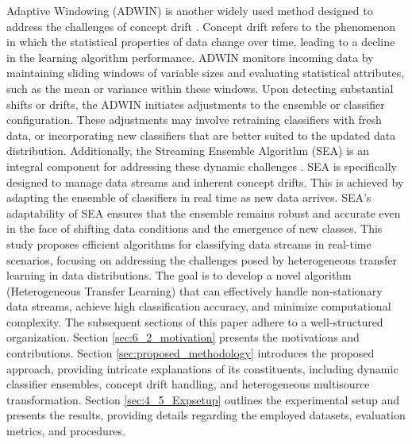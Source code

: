 Adaptive Windowing (ADWIN) is another widely used method designed to address the challenges of concept drift \cite{madkour2023historical}. Concept drift refers to the phenomenon in which the statistical properties of data change over time, leading to a decline in the learning algorithm performance. ADWIN monitors incoming data by maintaining sliding windows of variable sizes and evaluating statistical attributes, such as the mean or variance within these windows. Upon detecting substantial shifts or drifts, the ADWIN initiates adjustments to the ensemble or classifier configuration. These adjustments may involve retraining classifiers with fresh data, or incorporating new classifiers that are better suited to the updated data distribution. Additionally, the Streaming Ensemble Algorithm (SEA) is an integral component for addressing these dynamic challenges \cite{gama2004learning, adams2023explainable, madkour2023historical}. SEA is specifically designed to manage data streams and inherent concept drifts. This is achieved by adapting the ensemble of classifiers in real time as new data arrives. SEA's adaptability of SEA ensures that the ensemble remains robust and accurate even in the face of shifting data conditions and the emergence of new classes.
This study proposes efficient algorithms for classifying data streams in real-time scenarios, focusing on addressing the challenges posed by heterogeneous transfer learning in data distributions. The goal is to develop a novel algorithm (Heterogeneous Transfer Learning) that can effectively handle non-stationary data streams, achieve high classification accuracy, and minimize computational complexity. 
The subsequent sections of this paper adhere to a well-structured organization. Section \ref{sec:6_2_motivation} presents the motivations and contributions. Section \ref{sec:proposed_methodology} introduces the proposed approach, providing intricate explanations of its constituents, including dynamic classifier ensembles, concept drift handling, and heterogeneous multisource transformation. Section \ref{sec:4_5_Expsetup} outlines the experimental setup and presents the results, providing details regarding the employed datasets, evaluation metrics, and procedures.

